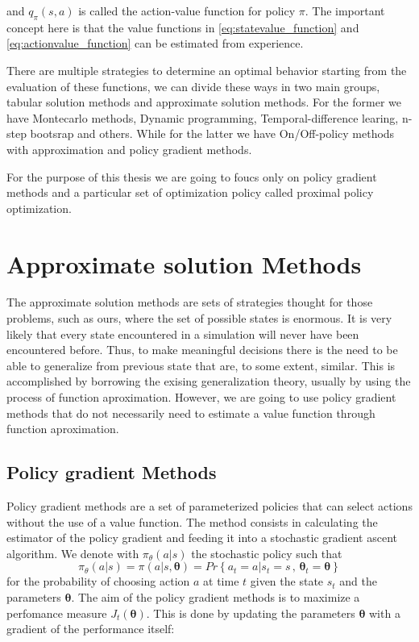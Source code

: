 and \( q_\pi(s,a) \) is called the action-value function for policy \( \pi \). The important concept here is that the value functions in \ref{eq:statevalue_function} and \ref{eq:actionvalue_function} can be estimated from experience. 

There are multiple strategies to determine an optimal behavior starting from the evaluation of these functions, we can divide these ways in two main groups, tabular solution methods and approximate solution methods\cite{sutton2018reinforcement}. For the former we have Montecarlo methods, Dynamic programming, Temporal-difference learing, n-step bootsrap and others. While for the latter we have On/Off-policy methods with approximation and policy gradient methods. 

For the purpose of this thesis we are going to foucs only on policy gradient methods and a particular set of optimization policy called proximal policy optimization.

\section{Approximate solution Methods}

The approximate solution methods are sets of strategies thought for those problems, such as ours, where the set of possible states is enormous. It is very likely that every state encountered in a simulation will never have been encountered before. Thus, to make meaningful decisions there is the need to be able to generalize from previous state that are, to some extent, similar. This is accomplished by borrowing the exising generalization theory, usually by using the process of function aproximation. However, we are going to use policy gradient methods that do not necessarily need to estimate a value function through function aproximation. 



\subsection{Policy gradient Methods}  


Policy gradient methods are a set of parameterized policies that can select actions without the use of a value function. The method consists in calculating the estimator of the policy gradient and feeding it into a stochastic gradient ascent algorithm. We denote with \( \pi_\theta(a|s) \) the stochastic policy such that 
\begin{equation}
  \pi_\theta(a|s) = \pi(a| s, \mathbf{\theta}) = Pr \left\{ a_t = a | s_t = s \, , \,   \mathbf{\theta}_t =  \mathbf{\theta}\right\}
\end{equation}
for the probability of choosing action \( a \) at time \(  t \) given the state \( s_t \) and the parameters \(  \mathbf{\theta} \). The aim of the policy gradient methods is to maximize a perfomance measure \( J_t( \mathbf{\theta}) \). This is done by updating the parameters \(  \mathbf{\theta} \) with a gradient of the performance itself:

